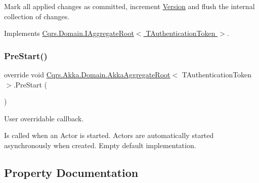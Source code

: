 Mark all applied changes as committed, increment \hyperlink{classCqrs_1_1Akka_1_1Domain_1_1AkkaAggregateRoot_a4b526322c63542b1da2a700ff1b48d0c_a4b526322c63542b1da2a700ff1b48d0c}{Version} and flush the internal collection of changes. 



Implements \hyperlink{interfaceCqrs_1_1Domain_1_1IAggregateRoot_af31116870bbf6566b3eec0b8bc02c6de_af31116870bbf6566b3eec0b8bc02c6de}{Cqrs.\+Domain.\+I\+Aggregate\+Root$<$ T\+Authentication\+Token $>$}.

\mbox{\label{classCqrs_1_1Akka_1_1Domain_1_1AkkaAggregateRoot_a7da2d3a244e34717ec5af1db8f0042bc_a7da2d3a244e34717ec5af1db8f0042bc}} 
\subsubsection{\texorpdfstring{Pre\+Start()}{PreStart()}}
{\footnotesize\ttfamily override void \hyperlink{classCqrs_1_1Akka_1_1Domain_1_1AkkaAggregateRoot}{Cqrs.\+Akka.\+Domain.\+Akka\+Aggregate\+Root}$<$ T\+Authentication\+Token $>$.Pre\+Start (\begin{DoxyParamCaption}{ }\end{DoxyParamCaption})\hspace{0.3cm}{\ttfamily [protected]}}



User overridable callback. 

Is called when an Actor is started. Actors are automatically started asynchronously when created. Empty default implementation. 



\subsection{Property Documentation}
\mbox{\label{classCqrs_1_1Akka_1_1Domain_1_1AkkaAggregateRoot_a3a73139fe47221bd579949e978d0126d_a3a73139fe47221bd579949e978d0126d}} 
